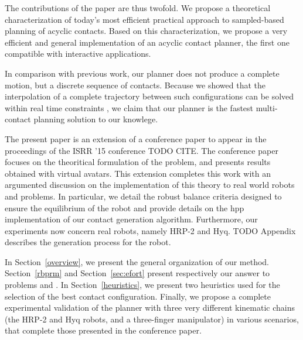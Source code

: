 The contributions of the paper are thus twofold. We propose a theoretical characterization of today's most efficient practical approach to sampled-based planning of acyclic contacts. Based on this characterization, we propose a very efficient and general implementation of an acyclic contact planner, the first one compatible with interactive applications.

In comparison with previous work, our planner does not produce a complete motion, but a discrete sequence of contacts.
Because we showed that the interpolation of a complete trajectory between such configurations can be solved within real time constraints \citep{Carpentier2016}, we claim that our planner
is the fastest multi-contact planning solution to our knowlege.

The present paper is an extension of a conference paper to appear in the proceedings of the ISRR '15 conference TODO CITE.
The conference paper focuses on the theoritical formulation of the problem, and presents results obtained with virtual avatars.
This extension completes this work with an argumented discussion on the implementation of this theory to real world robots and problems.
In particular, we detail the robust balance criteria designed to ensure the equilibrium of the robot and provide details on the hpp implementation
of our contact generation algorithm. Furthermore, our experiments now concern real robots, namely HRP-2 and Hyq. TODO Appendix describes the generation process
for the robot.

In Section~\ref{overview}, we present the general organization of our method. Section~\ref{rbprm} and Section~\ref{sec:efort} present respectively our answer to problems \Pa and \Pb. In Section~\ref{heuristics}, we present two heuristics used for the selection of the best contact configuration. Finally, we propose a complete experimental validation of the planner with three very different kinematic chains (the HRP-2 and Hyq robots, and a three-finger manipulator) in various scenarios,
that complete those presented in the conference paper.
